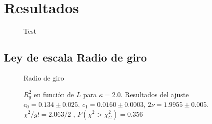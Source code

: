 \chapter{Resultados}

 \begin{figure}[h]
 \centering
  
 \caption{Test}
 \end{figure}

\section{Ley de escala Radio de giro}

\begin{figure}[h]
  \centering
  
  \caption{Radio de giro}
\end{figure}

\begin{figure}[h]
  \centering
  
  \caption{$R^2_g$ en función de $L$ para $\kappa=2.0$. Resultados del ajuste
    $c_0=0.134\pm 0.025$, $c_1=0.0160\pm 0.0003$, $2\nu=1.9955 \pm
    0.005$. $\chi^2/gl=2.063/2$ , $P(\chi^2>\chi_C^2)=0.356$}







\end{figure}



